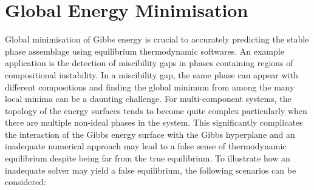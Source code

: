 \section{Global Energy Minimisation}\label{sec:global_opt_intro}
	 Global minimisation of Gibbs energy is crucial to accurately predicting the stable phase assemblage using equilibrium thermodynamic softwares. An example application is the detection of miscibility gaps in phases containing regions of compositional instability. In a miscibility gap, the same phase can appear with different compositions and finding the global minimum from among the many local minima can be a daunting challenge. For multi-component systems, the topology of the energy surfaces tends to become quite complex particularly when there are multiple non-ideal phases in the system. This significantly complicates the interaction of the Gibbs energy surface with the Gibbs hyperplane and an inadequate numerical approach may lead to a false sense of thermodynamic equilibrium despite being far from the true equilibrium. To illustrate how an inadequate solver may yield a false equilibrium, the following scenarios can be considered:
